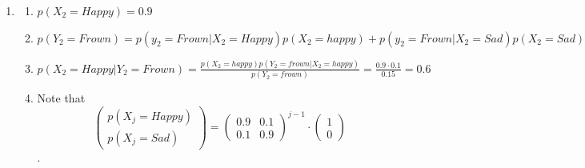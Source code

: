\usepackage{amsmath}
\usepackage{minted}
\usepackage{graphicx}
\graphicspath{ {.} }

\begin{enumerate}
\def\labelenumi{\arabic{enumi}.}
\item
  \begin{enumerate}  
  \def\labelenumii{\alph{enumii}.}
  \item
    \(p(X_2=Happy) = 0.9\)\\
  \item
    \(p(Y_2=Frown) = p(y_2=Frown|X_2=Happy)p(X_2=happy) + p(y_2=Frown|X_2=Sad)p(X_2=Sad)=0.1*0.9 + 0.6 * 0.1 = 0.15\)
  \item
    \(p(X_2=Happy | Y_2 = Frown) = \frac{p(X_2=happy)p(Y_2 = frown | X_2 = happy)}{p(Y_2 = frown)} = \frac{0.9 \cdot 0.1}{0.15} = 0.6\)
  \item

    Note that \[  
        \begin{pmatrix}
            p(X_j = Happy) \\
            p(X_j = Sad)
        \end{pmatrix}
        =
        \begin{pmatrix}
            0.9 & 0.1 \\
            0.1 & 0.9 
        \end{pmatrix}^{j - 1}
        \cdot
        \begin{pmatrix}
            1 \\
            0
        \end{pmatrix}
        \].


\end{enumerate}
\end{enumerate}
